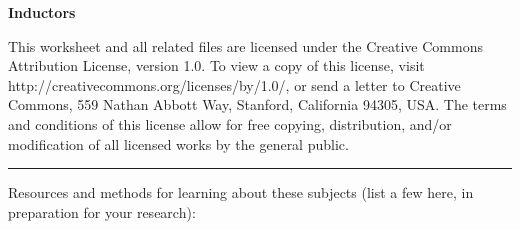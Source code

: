
\centerline{\bf Inductors} \bigskip 
 
This worksheet and all related files are licensed under the Creative Commons Attribution License, version 1.0.  To view a copy of this license, visit http://creativecommons.org/licenses/by/1.0/, or send a letter to Creative Commons, 559 Nathan Abbott Way, Stanford, California 94305, USA.  The terms and conditions of this license allow for free copying, distribution, and/or modification of all licensed works by the general public.

\bigskip 

\hrule

\vskip 10pt

Resources and methods for learning about these subjects (list a few here, in preparation for your research):

